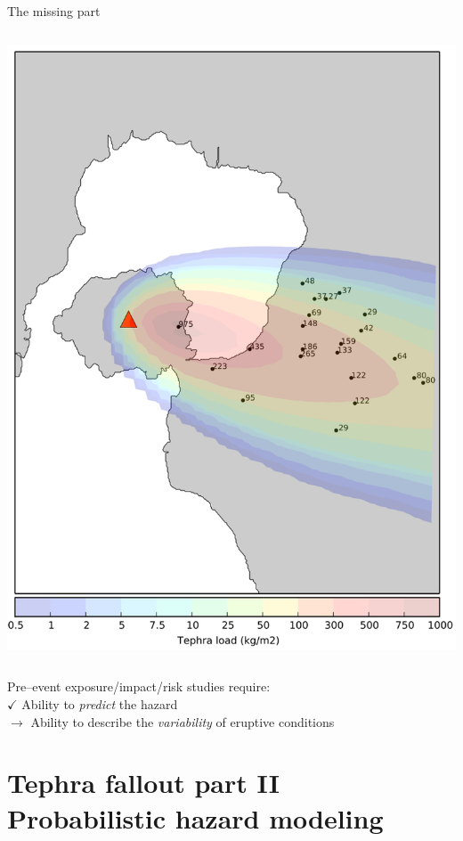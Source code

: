 \documentclass[10pt,aspectratio=169]{beamer}
\begin{document}
\begin{frame}[t]{The missing part}
\begin{columns}[T]
    \begin{column}{0.5\textwidth}	
      \centering \includegraphics[width=.8\textwidth]{img/tephra2_output.png}
    \end{column}
  \end{columns}

\end{frame}

\begin{frame}[standout]
  Pre--event exposure/impact/risk studies require:\\ \vspace*{1em}
  \alert{$\checkmark$ \textnormal{Ability to \textit{predict} the hazard}}\\
  $\rightarrow$ \textnormal{Ability to describe the \textit{variability} of eruptive conditions}
\end{frame}


\section{\alert{Tephra fallout part II} \\ Probabilistic hazard modeling}
\end{document}
